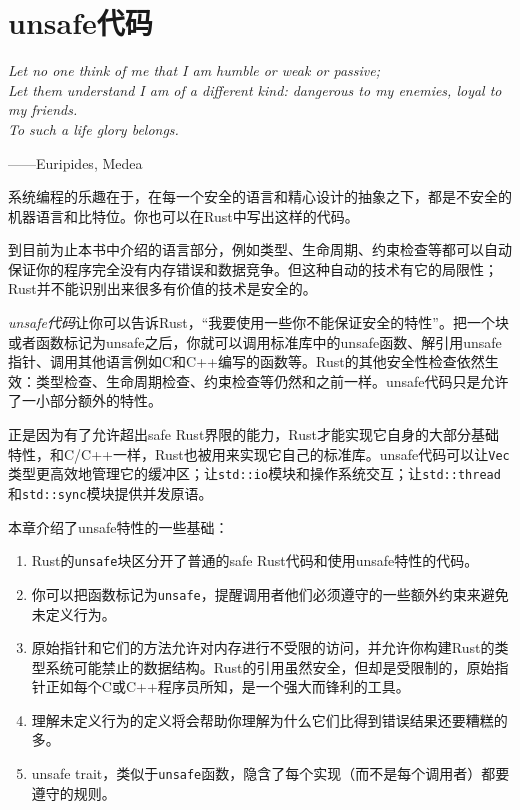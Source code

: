 \chapter{unsafe代码}\label{ch22}

\emph{Let no one think of me that I am humble or weak or passive; \\
Let them understand I am of a diﬀerent kind: dangerous to my enemies, loyal to my friends. \\
To such a life glory belongs.}
\begin{flushright}
    ——Euripides, Medea
\end{flushright}

系统编程的乐趣在于，在每一个安全的语言和精心设计的抽象之下，都是不安全的机器语言和比特位。你也可以在Rust中写出这样的代码。

到目前为止本书中介绍的语言部分，例如类型、生命周期、约束检查等都可以自动保证你的程序完全没有内存错误和数据竞争。但这种自动的技术有它的局限性；Rust并不能识别出来很多有价值的技术是安全的。

\emph{unsafe代码}让你可以告诉Rust，“我要使用一些你不能保证安全的特性”。把一个块或者函数标记为unsafe之后，你就可以调用标准库中的unsafe函数、解引用unsafe指针、调用其他语言例如C和C++编写的函数等。Rust的其他安全性检查依然生效：类型检查、生命周期检查、约束检查等仍然和之前一样。unsafe代码只是允许了一小部分额外的特性。

正是因为有了允许超出safe Rust界限的能力，Rust才能实现它自身的大部分基础特性，和C/C++一样，Rust也被用来实现它自己的标准库。unsafe代码可以让\texttt{Vec}类型更高效地管理它的缓冲区；让\texttt{std::io}模块和操作系统交互；让\texttt{std::thread}和\texttt{std::sync}模块提供并发原语。

本章介绍了unsafe特性的一些基础：

\begin{enumerate}
    \item Rust的\texttt{unsafe}块区分开了普通的safe Rust代码和使用unsafe特性的代码。
    \item 你可以把函数标记为\texttt{unsafe}，提醒调用者他们必须遵守的一些额外约束来避免未定义行为。
    \item 原始指针和它们的方法允许对内存进行不受限的访问，并允许你构建Rust的类型系统可能禁止的数据结构。Rust的引用虽然安全，但却是受限制的，原始指针正如每个C或C++程序员所知，是一个强大而锋利的工具。
    \item 理解未定义行为的定义将会帮助你理解为什么它们比得到错误结果还要糟糕的多。
    \item unsafe trait，类似于\texttt{unsafe}函数，隐含了每个实现（而不是每个调用者）都要遵守的规则。
\end{enumerate}

